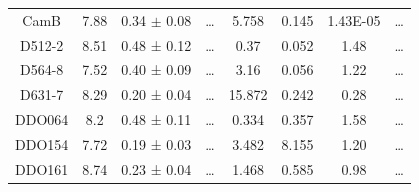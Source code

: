 \documentclass[reprint,%
 amsmath,amssymb,
 aps,
]{revtex4-1}
\begin{document}
\begin{longtable*}{|c|c|c|c|c|c|c|c| }
CamB                 & 7.88                      & 0.34 $\pm$ 0.08           & …                      & 5.758                                                        & 0.145                                                          & 1.43E-05                                                              & …                                                             \\
D512-2               & 8.51                      & 0.48 ± 0.12           & …                      & 0.37                                                         & 0.052                                                       & 1.48                                                           & …                                                             \\
D564-8               & 7.52                      & 0.40 ± 0.09           & …                      & 3.16                                                         & 0.056                                                          & 1.22                                                           & …                                                             \\
D631-7               & 8.29                      & 0.20 ± 0.04           & …                      & 15.872                                                       & 0.242                                                         & 0.28                                                           & …                                                             \\
DDO064               & 8.2                       & 0.48 ± 0.11           & …                      & 0.334                                                        & 0.357                                                         & 1.58                                                           & …                                                             \\
DDO154               & 7.72                      & 0.19 ± 0.03           & …                      & 3.482                                                        & 8.155                                                            & 1.20                                                          & …                                                             \\
DDO161               & 8.74                      & 0.23 ± 0.04           & …                      & 1.468                                                        & 0.585                                                         & 0.98                                                           & …                                                             \\

\end{longtable*}
\end{document}
